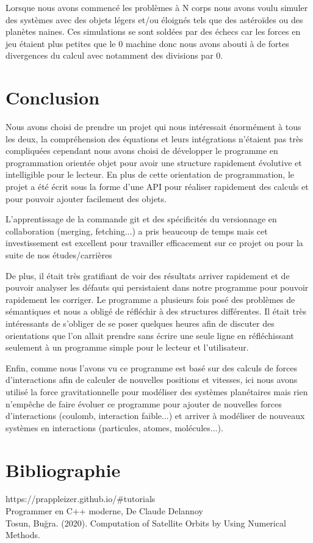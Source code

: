 \documentclass[11pt]{article}
\begin{document}
Lorsque nous avons commencé les problèmes à N corps nous avons voulu simuler des systèmes avec des objets légers et/ou éloignés tels que des astéroïdes ou des planètes naines. Ces simulations se sont soldées par des échecs car les forces en jeu étaient plus petites que le 0 machine donc nous avons abouti à de fortes divergences du calcul avec notamment des divisions par 0.

\section{Conclusion}
Nous avons choisi de prendre un projet qui nous intéressait énormément à tous les deux, la compréhension des équations et leurs intégrations n'étaient pas très compliquées cependant nous avons choisi de développer le programme en programmation orientée objet pour avoir une structure rapidement évolutive et intelligible pour le lecteur. En plus de cette orientation de programmation, le projet a été écrit sous la forme d'une API pour réaliser rapidement des calculs et pour pouvoir ajouter facilement des objets.

L'apprentissage de la commande git et des spécificités du versionnage  en collaboration (merging, fetching...) a pris beaucoup de temps mais cet investissement est excellent pour travailler efficacement sur ce projet ou pour la suite de nos études/carrières

De plus, il était très gratifiant de voir des résultats arriver rapidement et de pouvoir analyser les défauts qui persistaient dans notre programme pour pouvoir rapidement les corriger. Le programme a plusieurs fois posé des problèmes de sémantiques et nous a obligé de réfléchir à des structures différentes. Il était très intéressants de s'obliger de se poser quelques heures afin de discuter des orientations que l'on allait prendre sans écrire une seule ligne en réfléchissant seulement à un programme simple pour le lecteur et l'utilisateur.

Enfin, comme nous l'avons vu ce programme est basé sur des calculs de forces d'interactions afin de calculer de nouvelles positions et vitesses, ici nous avons utilisé la force gravitationnelle pour modéliser des systèmes planétaires mais rien n'empêche de faire évoluer ce programme pour ajouter de nouvelles forces d'interactions (coulomb, interaction faible...) et arriver à modéliser de nouveaux systèmes en interactions (particules, atomes, molécules...). 

\section{Bibliographie}
https://prappleizer.github.io/#tutorials\\
Programmer en C++ moderne, De Claude Delannoy\\
Tosun, Buğra. (2020). Computation of Satellite Orbits by Using Numerical Methods. \\
\end{document}
